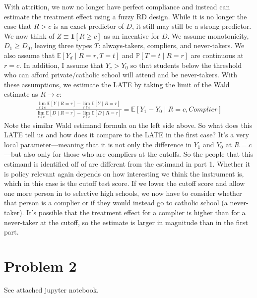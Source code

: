 \documentclass{article}
\begin{document}
\begin{solution}
With attrition, we now no longer have perfect compliance and instead can estimate the treatment effect using a fuzzy RD design. While it is no longer the case that $R>c$ is an exact predictor of $D$, it still may still be a strong predictor. We now think of $Z\equiv \mathbf{1}[R\geq c]$ as an incentive for $D$. We assume monotonicity, $D_1 \geq D_0$, leaving three types $T$: always-takers, compliers, and never-takers. We also assume that $\mathbb{E}\left[Y_{d} \mid R=r, T=t\right]$ and $\mathbb{P}[T=t \mid R=r]$ are continuous at $r=c$. In addition, I assume that $Y_c>Y_0$ so that students below the threshold who can afford private/catholic school will attend and be never-takers. With these assumptions, we estimate the LATE by taking the limit of the Wald estimate as $R \to c$:
\begin{align*}
    \frac{\lim _{r \downarrow c} \mathbb{E}[Y \mid R=r]-\lim _{r \uparrow c} \mathbb{E}[Y \mid R=r]}{\lim _{r \downarrow c} \mathbb{E}[D \mid R=r]-\lim _{r \uparrow c} \mathbb{E}[D \mid R=r]}=\mathbb{E}\left[Y_{1}-Y_{0} \mid R=c, Complier\right]
\end{align*}
Note the similar Wald estimand formula on the left side above. So what does this LATE tell us and how does it compare to the LATE in the first case? It's a very local parameter---meaning that it is not only the difference in $Y_1$ and $Y_0$ at $R=c$---but also only for those who are compliers at the cutoffs. So the people that this estimand is identified off of are different from the estimand in part 1. Whether it is policy relevant again depends on how interesting we think the instrument is, which in this case is the cutoff test score. If we lower the cutoff score and allow one more person in to selective high schools, we now have to consider whether that person is a complier or if they would instead go to catholic school (a never-taker). It's possible that the treatment effect for a complier is higher than for a never-taker at the cutoff, so the estimate is larger in magnitude than in the first part.

\end{solution}

\newpage
\section*{Problem 2}

See attached jupyter notebook.
\end{document}
